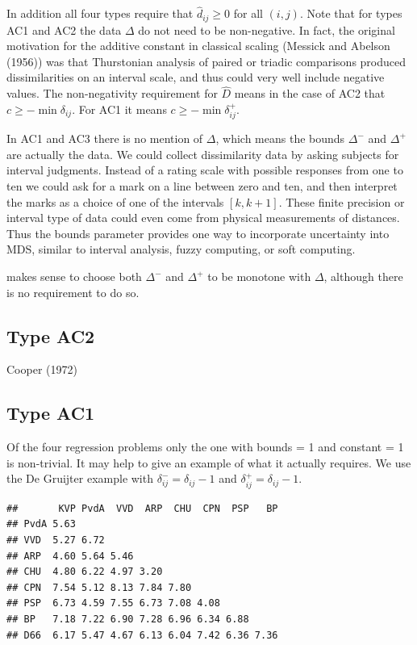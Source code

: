 \documentclass[
  12pt,
]{article}
\begin{document}
In addition all four types require that \(\hat d_{ij}\geq 0\) for all \((i,j)\). Note that for
types AC1 and AC2 the data \(\Delta\) do not need to be non-negative. In fact,
the original motivation for the additive constant in classical scaling (Messick and Abelson (1956))
was that Thurstonian analysis of paired or triadic comparisons produced dissimilarities on an interval scale, and thus could very well include negative values. The non-negativity requirement
for \(\hat D\) means in the case of AC2 that \(c\geq-\min\delta_{ij}\). For AC1 it means
\(c\geq-\min\delta_{ij}^+\).

In AC1 and AC3 there is no mention of \(\Delta\), which means
the bounds \(\Delta^-\) and \(\Delta^+\) are actually the data. We could
collect dissimilarity data by asking subjects for interval judgments. Instead
of a rating scale with possible responses from one to ten we could ask
for a mark on a line between zero and ten, and then interpret the
marks as a choice of one of the intervals \([k, k+1]\). These finite precision
or interval type of data could even come from physical measurements of distances.
Thus the bounds parameter provides one way to incorporate uncertainty into MDS, similar to interval analysis, fuzzy computing, or soft computing.

makes sense to choose both \(\Delta^-\) and \(\Delta^+\) to be monotone with \(\Delta\),
although there is no requirement to do so.

\subsection{Type AC2}\label{type-ac2}

Cooper (1972)

\subsection{Type AC1}\label{type-ac1}

Of the four regression problems only the one with bounds = 1 and constant = 1 is non-trivial.
It may help to give an example of what it actually requires. We use the De Gruijter example
with \(\delta_{ij}^-=\delta_{ij}-1\) and \(\delta_{ij}^+=\delta_{ij}-1\).

\begin{verbatim}
##       KVP PvdA  VVD  ARP  CHU  CPN  PSP   BP
## PvdA 5.63                                   
## VVD  5.27 6.72                              
## ARP  4.60 5.64 5.46                         
## CHU  4.80 6.22 4.97 3.20                    
## CPN  7.54 5.12 8.13 7.84 7.80               
## PSP  6.73 4.59 7.55 6.73 7.08 4.08          
## BP   7.18 7.22 6.90 7.28 6.96 6.34 6.88     
## D66  6.17 5.47 4.67 6.13 6.04 7.42 6.36 7.36
\end{verbatim}
\end{document}
